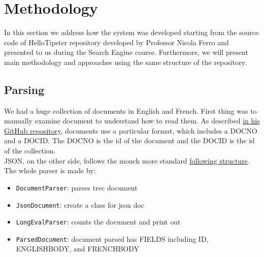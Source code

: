 \section{Methodology}
\label{sec:methodology}
In this section we address how the system was developed starting from the source code of
HelloTipster\cite{tipser} repository developed by Professor Nicola Ferro
and presented to us during the Search Engine course.
Furthermore, we will present main methodology and approaches
using the same structure of the repository\cite{jihuming}.

\subsection{Parsing}
We had a huge collection of documents in English and French. First thing
was to manually examine document to understand how to read them. As described
\href{https://github.com/joaopalotti/trectools}{in his GitHub repository},
documents use a particular format, which includes a DOCNO and a DOCID.
The DOCNO is the id of the document and the DOCID is the id of the collection.\\
JSON, on the other side, follows the mouch more standard
\href{https://github.com/castorini/anserini/issues/1111}{following structure}.\\
The whole parser is made by:
\begin{itemize}
    \item \texttt{DocumentParser}: parses trec document
    \item \texttt{JsonDocument}: create a class for json doc
    \item \texttt{LongEvalParser}: counts the document and print out
    \item \texttt{ParsedDocument}: document parsed has FIELDS including ID,
    ENGLISH\textunderscore BODY, and FRENCH\textunderscore BODY
\end{itemize}
